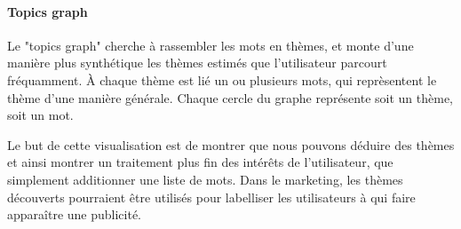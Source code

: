 			\paragraph{Topics graph}

				Le "topics graph" cherche à rassembler les mots en thèmes, et monte d'une manière plus synthétique les thèmes estimés que l'utilisateur parcourt fréquamment. À chaque thème est lié un ou plusieurs mots, qui reprèsentent le thème d'une manière générale. Chaque cercle du graphe représente soit un thème, soit un mot.

				Le but de cette visualisation est de montrer que nous pouvons déduire des thèmes et ainsi montrer un traitement plus fin des intérêts de l'utilisateur, que simplement additionner une liste de mots. Dans le marketing, les thèmes découverts pourraient être utilisés pour labelliser les utilisateurs à qui faire apparaître une publicité.